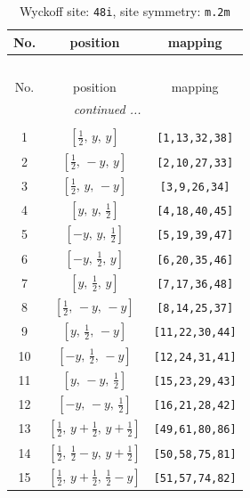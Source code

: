 \documentclass[fleqn,8pt]{jsarticle}
\begin{document}
\begin{longtable}{ccc}
\caption{Wyckoff site: {\tt 48i}, site symmetry: {\tt m.2m}}
 \\
 \hline \hline
No. & position & mapping \\ \hline \endfirsthead

\multicolumn{2}{l}{\tablename\ \thetable{}} \\
 \hline \hline
No. & position & mapping \\ \hline \endhead

 \hline \hline
\multicolumn{2}{r}{\footnotesize\it continued ...} \\ \endfoot

 \hline \hline
\multicolumn{2}{r}{} \\ \endlastfoot

1 & $\left[ \frac{1}{2},\, y,\, y \right]$ & {\tt [1,13,32,38]} \\ \hline
2 & $\left[ \frac{1}{2},\, - y,\, y \right]$ & {\tt [2,10,27,33]} \\ \hline
3 & $\left[ \frac{1}{2},\, y,\, - y \right]$ & {\tt [3,9,26,34]} \\ \hline
4 & $\left[ y,\, y,\, \frac{1}{2} \right]$ & {\tt [4,18,40,45]} \\ \hline
5 & $\left[ - y,\, y,\, \frac{1}{2} \right]$ & {\tt [5,19,39,47]} \\ \hline
6 & $\left[ - y,\, \frac{1}{2},\, y \right]$ & {\tt [6,20,35,46]} \\ \hline
7 & $\left[ y,\, \frac{1}{2},\, y \right]$ & {\tt [7,17,36,48]} \\ \hline
8 & $\left[ \frac{1}{2},\, - y,\, - y \right]$ & {\tt [8,14,25,37]} \\ \hline
9 & $\left[ y,\, \frac{1}{2},\, - y \right]$ & {\tt [11,22,30,44]} \\ \hline
10 & $\left[ - y,\, \frac{1}{2},\, - y \right]$ & {\tt [12,24,31,41]} \\ \hline
11 & $\left[ y,\, - y,\, \frac{1}{2} \right]$ & {\tt [15,23,29,43]} \\ \hline
12 & $\left[ - y,\, - y,\, \frac{1}{2} \right]$ & {\tt [16,21,28,42]} \\ \hline
13 & $\left[ \frac{1}{2},\, y + \frac{1}{2},\, y + \frac{1}{2} \right]$ & {\tt [49,61,80,86]} \\ \hline
14 & $\left[ \frac{1}{2},\, \frac{1}{2} - y,\, y + \frac{1}{2} \right]$ & {\tt [50,58,75,81]} \\ \hline
15 & $\left[ \frac{1}{2},\, y + \frac{1}{2},\, \frac{1}{2} - y \right]$ & {\tt [51,57,74,82]} \\ \hline

\end{longtable}
\end{document}
